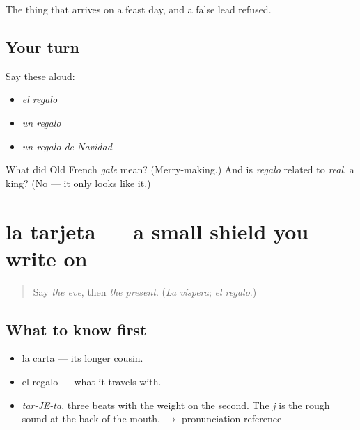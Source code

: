 \begin{grammarlens}[title={What you've built}]
The thing that arrives on a feast day, and a false lead refused.
\end{grammarlens}

\subsection*{Your turn}
Say these aloud:

\begin{itemize}
\raggedright
  \item \emph{el regalo}
  \item \emph{un regalo}
  \item \emph{un regalo de Navidad}
\end{itemize}

\begin{tcolorbox}[breakable,colback=teal!4,colframe=teal!35!black,title={Before you move on}]
What did Old French \emph{gale} mean? (Merry-making.) And is \emph{regalo} related to \emph{real}, a king? (No — it only looks like it.)
\end{tcolorbox}
\section[la tarjeta]{la tarjeta — a small shield you write on}

\label{lesson:ES-C357-tarjeta}



\begin{quote}
Say \emph{the eve}, then \emph{the present}. (\emph{La víspera}; \emph{el regalo}.)
\end{quote}

\subsection*{What to know first}
\begin{itemize}
\raggedright
  \item la carta — its longer cousin.
  \item el regalo — what it travels with.
\end{itemize}

\begin{sounds}
\begin{itemize}
\raggedright
  \item \emph{tar-JE-ta}, three beats with the weight on the second. The \emph{j} is the rough sound at the back of the mouth. $\to$ pronunciation reference
\end{itemize}
\end{sounds}

